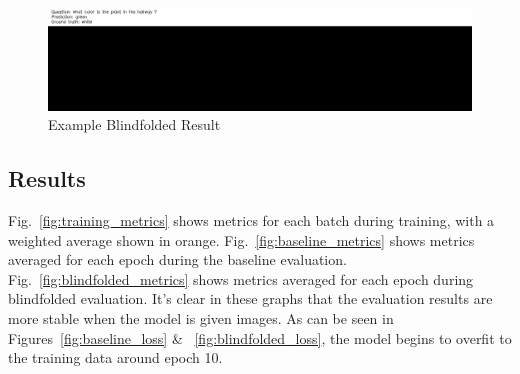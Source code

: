 \begin{figure}[H]
	\centering
        \includegraphics[width=\textwidth]{./figure/results/baseline_and_blindfolding/blindfolded/ckpt_23_1250_image.jpg}
	\caption{Example Blindfolded Result}
	\label{fig:example_blindfolded_result}
\end{figure}

\subsection{Results}
Fig.~\ref{fig:training_metrics} shows metrics for each batch during training, with a weighted average shown in orange. %
Fig.~\ref{fig:baseline_metrics} shows metrics averaged for each epoch during the baseline evaluation. Fig.~\ref{fig:blindfolded_metrics} shows metrics averaged for each epoch during blindfolded evaluation. It's clear in these graphs that the evaluation results are more stable when the model is given images. As can be seen in Figures~\ref{fig:baseline_loss} \& ~\ref{fig:blindfolded_loss}, the model begins to overfit to the training data around epoch 10.

